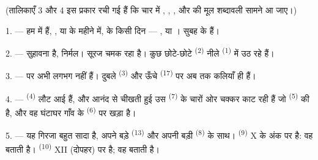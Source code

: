 %

\VUsaut{3.0mm}
\VUsaut{1.6mm}
\VUsaut{3.4mm}

(तालिकाएँ 3 और 4 इस प्रकार रची गई हैं कि चार  में
, , ,  और
 की मूल शब्दावली सामने आ जाए।)
\VUsaut{4.0mm}

\VUsaut{3.0mm}

\VUsaut{2.4mm}

\VUsaut{3.0mm}

1. --- हम  में हैं, ,  या
 के महीने में,  के किसी दिन --- ,
 या । सुबह के  हैं।

2. ---  सुहावना है,  निर्मल। सूरज चमक रहा है। कुछ छोटे-छोटे 
\textsuperscript{(2)} नीले  \textsuperscript{(1)} में उठ रहे हैं।

3. ---  पर अभी  लगभग नहीं हैं। दुबले
 \textsuperscript{(3)} और ऊँचे 
\textsuperscript{(17)} पर अब तक कलियाँ ही हैं।

4. ---  \textsuperscript{(4)} लौट आई हैं, और आनंद से चीखती
हुई उस  \textsuperscript{(7)} के चारों ओर चक्कर काट रही हैं जो
 \textsuperscript{(5)} की है, और वह घंटाघर गाँव के
 \textsuperscript{(6)} पर खड़ा है।

\VUsaut{3.4mm}
\VUsaut{3.0mm}

5. --- यह गिरजा बहुत सादा है, अपने बड़े  \textsuperscript{(13)} और
अपनी बड़ी  \textsuperscript{(8)} के साथ। 
\textsuperscript{(9)} X के अंक पर है: वह  बताती है।
 \textsuperscript{(10)} XII (दोपहर) पर है; वह 
बताती है।


